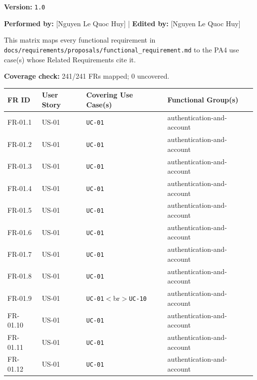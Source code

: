 \documentclass[12pt]{article}
\renewcommand{\baselinestretch}{1.5}
\begin{document}
\textbf{Version:} \texttt{1.0}
\par\medskip

\textbf{Performed by:} [Nguyen Le Quoc Huy] | \textbf{Edited by:} [Nguyen Le Quoc Huy]
\par\medskip

This matrix maps every functional requirement in \texttt{docs/requirements/proposals/functional\_requirement.md} to the PA4 use case(s) whose Related Requirements cite it.
\par\medskip

\textbf{Coverage check:} 241/241 FRs mapped; 0 uncovered.
\par\medskip

\begingroup
\small
\renewcommand{\baselinestretch}{1.0}\selectfont
\renewcommand{\arraystretch}{1.15}
\setlength{\tabcolsep}{6pt}
\begin{longtable}{|>{\raggedright\arraybackslash}p{}|>{\raggedright\arraybackslash}p{}|>{\raggedright\arraybackslash}p{}|>{\raggedright\arraybackslash}p{}|}
\hline
\textbf{FR ID} & \textbf{User Story} & \textbf{Covering Use Case(s)} & \textbf{Functional Group(s)} \\ \hline
\endhead
FR-01.1 & US-01 & \texttt{UC-01} & authentication-and-account \\ \hline
FR-01.2 & US-01 & \texttt{UC-01} & authentication-and-account \\ \hline
FR-01.3 & US-01 & \texttt{UC-01} & authentication-and-account \\ \hline
FR-01.4 & US-01 & \texttt{UC-01} & authentication-and-account \\ \hline
FR-01.5 & US-01 & \texttt{UC-01} & authentication-and-account \\ \hline
FR-01.6 & US-01 & \texttt{UC-01} & authentication-and-account \\ \hline
FR-01.7 & US-01 & \texttt{UC-01} & authentication-and-account \\ \hline
FR-01.8 & US-01 & \texttt{UC-01} & authentication-and-account \\ \hline
FR-01.9 & US-01 & \texttt{UC-01}$<$br$>$\texttt{UC-10} & authentication-and-account \\ \hline
FR-01.10 & US-01 & \texttt{UC-01} & authentication-and-account \\ \hline
FR-01.11 & US-01 & \texttt{UC-01} & authentication-and-account \\ \hline
FR-01.12 & US-01 & \texttt{UC-01} & authentication-and-account \\ \hline

\end{longtable}
\end{document}
